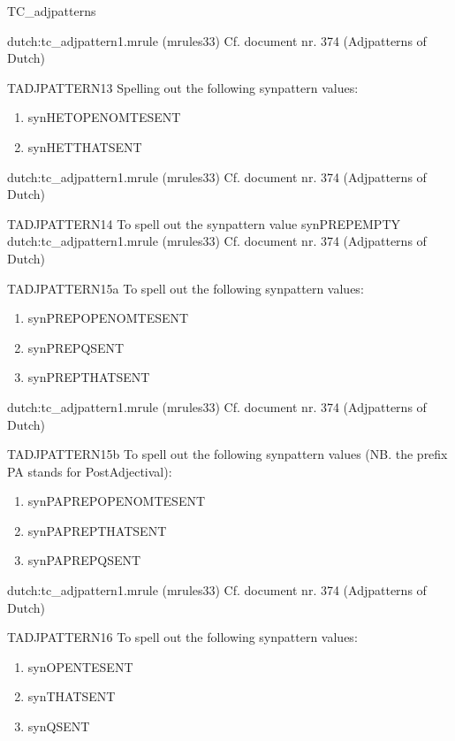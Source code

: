 \begin{mruleclass}{TC\_adjpatterns}
\begin{members}
\begin{member}
\file dutch:tc\_adjpattern1.mrule (mrules33)
\semantics \nosemantics
\example Cf. document nr. 374 (Adjpatterns of Dutch)
\remarks

\end{member}
\begin{member}
 TADJPATTERN13
 Spelling out the following synpattern values:
\begin{enumerate}
  \item synHETOPENOMTESENT
  \item synHETTHATSENT
\end{enumerate}
\file dutch:tc\_adjpattern1.mrule (mrules33)
\semantics \nosemantics
\example Cf. document nr. 374 (Adjpatterns of Dutch)
\remarks

\end{member}
\begin{member}
 TADJPATTERN14
 To spell out the synpattern value synPREPEMPTY
\file dutch:tc\_adjpattern1.mrule (mrules33)
\semantics \nosemantics
\example Cf. document nr. 374 (Adjpatterns of Dutch)
\remarks

\end{member}
\begin{member}
 TADJPATTERN15a
 To spell out the following synpattern values:
\begin{enumerate}
  \item  synPREPOPENOMTESENT
  \item  synPREPQSENT
  \item  synPREPTHATSENT
\end{enumerate}
\file dutch:tc\_adjpattern1.mrule (mrules33)
\semantics \nosemantics
\example Cf. document nr. 374 (Adjpatterns of Dutch)
\remarks

\end{member}
\begin{member}
 TADJPATTERN15b
 To spell out the following synpattern values
(NB. the prefix PA stands for PostAdjectival):
\begin{enumerate}
  \item synPAPREPOPENOMTESENT
  \item synPAPREPTHATSENT
  \item synPAPREPQSENT
\end{enumerate}
\file dutch:tc\_adjpattern1.mrule (mrules33)
\semantics \nosemantics
\example Cf. document nr. 374 (Adjpatterns of Dutch)
\remarks

\end{member}
\begin{member}
 TADJPATTERN16
 To spell out the following synpattern values:
\begin{enumerate}
  \item synOPENTESENT
  \item synTHATSENT
  \item synQSENT
\end{enumerate}


\end{member}
\end{members}
\end{mruleclass}
